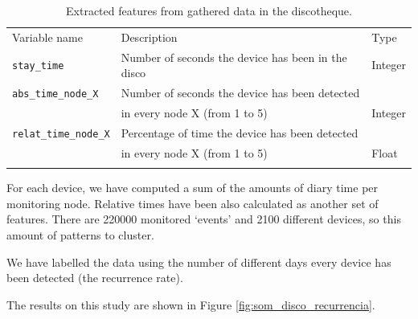 \documentclass[preprint]{elsarticle}
\begin{document}
\begin{table}[htpb]
\centering
{\scriptsize
\begin{tabular}{lll}
\hline\noalign{\smallskip}
Variable name & Description & Type\\
\noalign{\smallskip}\hline\noalign{\smallskip}
\texttt{stay\_time} & Number of seconds the device has been in the disco & Integer\\
\texttt{abs\_time\_node\_X} & Number of seconds the device has been detected\\
& in every node X (from 1 to 5) & Integer\\
\texttt{relat\_time\_node\_X} & Percentage of time the device has been detected\\
& in every node X (from 1 to 5) & Float\\
\noalign{\smallskip}\hline
\end{tabular}
 \caption{Extracted features from gathered data in the discotheque. \label{tab:features_recurrence_disco}}
}
\end{table}

For each device, we have computed a sum of the amounts of diary time per monitoring node. Relative times have been also calculated as another set of features. There are 220000 monitored `events' and 2100 different devices, so this amount of patterns to cluster.

We have labelled the data using the number of different days every device has been detected (the recurrence rate).

The results on this study are shown in Figure \ref{fig:som_disco_recurrencia}.
\end{document}
